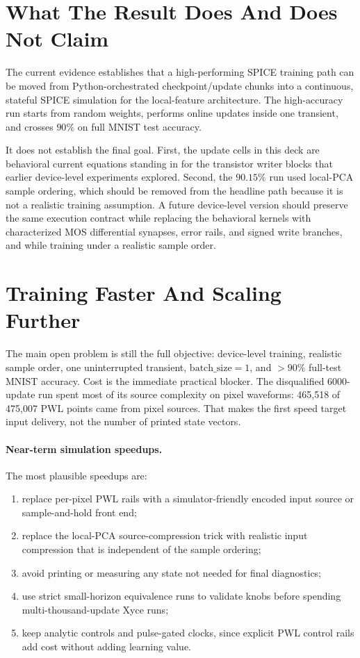 \documentclass[11pt]{article}
\begin{document}
\section{What The Result Does And Does Not Claim}

The current evidence establishes that a high-performing SPICE training path can
be moved from Python-orchestrated checkpoint/update chunks into a continuous,
stateful SPICE simulation for the local-feature architecture.  The
high-accuracy run starts from random weights, performs online updates inside
one transient, and crosses \(90\%\) on full MNIST test accuracy.

It does not establish the final goal.  First, the update cells in this deck are
behavioral current equations standing in for the transistor writer blocks that
earlier device-level experiments explored.  Second, the \(90.15\%\) run used
local-PCA sample ordering, which should be removed from the headline path
because it is not a realistic training assumption.  A future device-level
version should preserve the same execution contract while replacing the
behavioral kernels with characterized MOS differential synapses, error rails,
and signed write branches, and while training under a realistic sample order.

\section{Training Faster And Scaling Further}

The main open problem is still the full objective: device-level training,
realistic sample order, one uninterrupted transient, \(\mathrm{batch\_size}=1\),
and \(>90\%\) full-test MNIST accuracy.  Cost is the immediate practical
blocker.  The disqualified 6000-update run spent most of its source complexity
on pixel waveforms: 465,518 of 475,007 PWL points came from pixel sources.
That makes the first speed target input delivery, not the number of printed
state vectors.

\paragraph{Near-term simulation speedups.}
The most plausible speedups are:
\begin{enumerate}
  \item replace per-pixel PWL rails with a simulator-friendly encoded input
    source or sample-and-hold front end;
  \item replace the local-PCA source-compression trick with realistic input
    compression that is independent of the sample ordering;
  \item avoid printing or measuring any state not needed for final diagnostics;
  \item use strict small-horizon equivalence runs to validate knobs before
    spending multi-thousand-update Xyce runs;
  \item keep analytic controls and pulse-gated clocks, since explicit PWL
    control rails add cost without adding learning value.
\end{enumerate}
\end{document}
